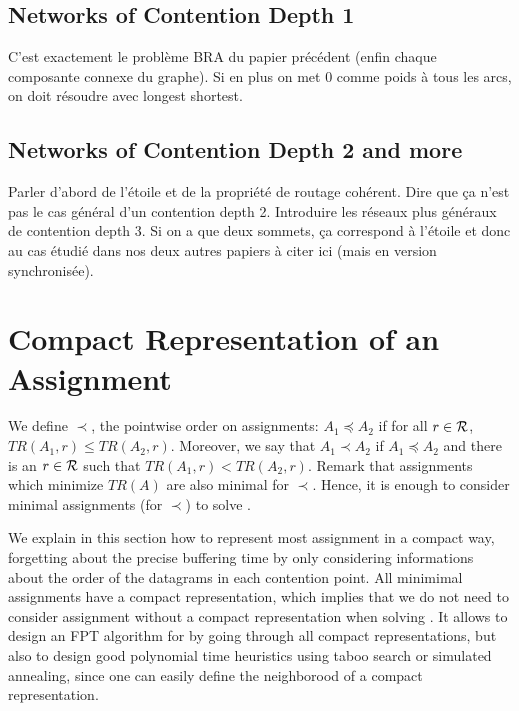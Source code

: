 \documentclass[english]{article}
\begin{document}
\subsection{Networks of Contention Depth  1}

C'est exactement le problème BRA du papier précédent (enfin chaque composante connexe du graphe).
Si en plus on met $0$ comme poids à tous les arcs, on doit résoudre avec longest shortest.

\subsection{Networks of Contention Depth  2 and more}

Parler d'abord de l'étoile et de la propriété de routage cohérent. Dire que ça n'est pas le cas général d'un contention depth 2. Introduire les réseaux plus généraux de contention depth 3.
Si on a que deux sommets, ça correspond à l'étoile et donc au cas étudié dans nos deux autres papiers à citer ici
(mais en version synchronisée). 

    

\section{Compact Representation of an Assignment}

 We define $\prec$, the pointwise order on assignments: $A_1 \preceq A_2$ if for all $r\in \cal{R}$, $TR(A_1,r) \leq TR(A_2,r)$. Moreover, we say that $A_1 \prec A_2$ if $A_1 \preceq A_2$ and there is an $r \in \cal {R}$ such that  $TR(A_1,r) < TR(A_2,r)$. Remark that assignments which minimize $TR(A)$ are also minimal for $\prec$. Hence, it is enough to consider minimal assignments (for $\prec$) to solve \spall.

We explain in this section how to represent most assignment in a compact way, forgetting about the precise buffering time by only considering informations about the order of the datagrams in each contention point. All minimimal assignments have a compact representation, which implies that we do not need to consider assignment without a compact representation when solving \spall. 
It allows to design an FPT algorithm for \spall by going through all compact representations, but also to design good polynomial time heuristics using taboo search or simulated annealing, since one can easily define the neighborood of a compact representation.
\end{document}
